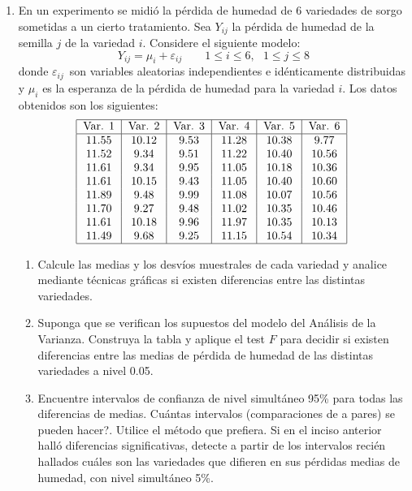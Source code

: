 \documentclass[11pt,a4paper,twoside]{article}%
\begin{document}
\begin{enumerate}
\item En un experimento se midi\'{o} la p\'{e}rdida de humedad de 6 variedades
de sorgo sometidas a un cierto tratamiento. Sea $Y_{ij}$ la p\'{e}rdida de
humedad de la semilla $j$ de la variedad $i$. Considere el siguiente modelo:%
\[
Y_{ij}=\mu_{i}+\varepsilon_{ij}\qquad1\leq i\leq6,\text{ }1\leq j\leq8
\]
donde $\varepsilon_{ij}$\ son variables aleatorias independientes e
id\'{e}nticamente distribuidas y $\mu_{i}$ es la esperanza de la p\'{e}rdida
de humedad para la variedad $i$. Los datos obtenidos son los siguientes:%
\[
\text{%
\begin{tabular}
[c]{|c|c|c|c|c|c|}\hline
Var. 1 & Var. 2 & Var. 3 & Var. 4 & Var. 5 & Var. 6\\\hline
11.55 & 10.12 & 9.53 & 11.28 & 10.38 & 9.77\\
11.52 & 9.34 & 9.51 & 11.22 & 10.40 & 10.56\\
11.61 & 9.34 & 9.95 & 11.05 & 10.18 & 10.36\\
11.61 & 10.15 & 9.43 & 11.05 & 10.40 & 10.60\\
11.89 & 9.48 & 9.99 & 11.08 & 10.07 & 10.56\\
11.70 & 9.27 & 9.48 & 11.02 & 10.35 & 10.46\\
11.61 & 10.18 & 9.96 & 11.97 & 10.35 & 10.13\\
11.49 & 9.68 & 9.25 & 11.15 & 10.54 & 10.34\\\hline
\end{tabular}
}%
\]


\begin{enumerate}
\item Calcule las medias y los desv\'ios muestrales de cada variedad y analice mediante t\'ecnicas gr\'aficas si
existen diferencias entre las distintas variedades.


\item Suponga que se verifican los supuestos del modelo del An\'{a}lisis de la
Varianza. Construya la tabla y aplique el test $F$ para decidir si existen
diferencias entre las medias de p\'{e}rdida de humedad de las distintas
variedades a nivel 0.05.

\item Encuentre intervalos de confianza de nivel simult\'{a}neo 95\% para
todas las diferencias de medias. \textquestiondown Cu\'{a}ntas intervalos
(comparaciones de a pares) se pueden hacer?. Utilice el m\'{e}todo que
prefiera. Si en el inciso anterior hall\'{o} diferencias significativas,
detecte a partir de los intervalos reci\'{e}n hallados cu\'{a}les son las
variedades que difieren en sus p\'{e}rdidas medias de humedad, con nivel
simult\'{a}neo 5\%.


\end{enumerate}
\end{enumerate}
\end{document}
